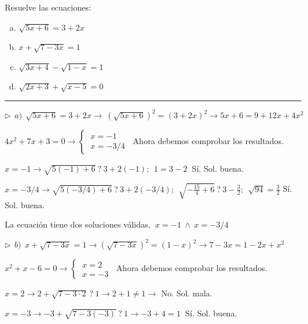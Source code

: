 \begin{miejercicio}

Resuelve las ecuaciones: 

\begin{multicols}{2}
\begin{enumerate}[a) ]
\item $\sqrt{5x+6}=3+2x$
\item $x+\sqrt{7-3x}=1$
\item $\sqrt{3x+4}-\sqrt{1-x}=1$
\item $\sqrt{2x+3}+\sqrt{x-5}=0$	
\end{enumerate}
\end{multicols}

\rule{250pt}{0.1pt}

\vspace{2mm} $\triangleright \ \ a)\ \ \sqrt{5x+6}=3+2x \to \ (\sqrt{5x+6})^2=(3+2x)^2 \to 5x+6=9+12x+4x^2  $

\vspace{2mm} $4x^2+7x+3=0 \to \begin{cases} \ x=-1 \\ \ x=-3/4 \end{cases} \ $ Ahora debemos comprobar los resultados.


\vspace{2mm} $x=-1 \to \sqrt{5(-1)+6} \ ? \  3+2(-1);\ \ 1=3-2 \ $ Sí. Sol. buena.

\vspace{2mm} $x=-3/4 \to \sqrt{5(-3/4)+6}\ ? \ 3+2(-3/4);\ \  \sqrt{-\frac {15}{4} +6} \ ? \ 3-\frac 3 2;\ \ \sqrt{9 4}=\frac 3 2 $ Sí. Sol. buena.

\vspace{2mm} La ecuación tiene dos soluciones válidas, $\ x=-1 \ \wedge \ x=-3/4$

\vspace{5mm} $\triangleright \ \ b)\ \ x+\sqrt{7-3x}=1 \to (\sqrt{7-3x})^2=(1-x)^2 \to 7-3x=1-2x+x^2$

\vspace{2mm} $x^2+x-6=0 \to \begin{cases}\ x=2 \\ \ x=-3 \end{cases}\ $ Ahora debemos comprobar los resultados.

\vspace{2mm} $x=2 \to 2+\sqrt{7-3\cdot 2} \ ? \ 1 \to 2+1 \neq 1 \to $ No. Sol. mala.

\vspace{2mm} $x=-3 \to -3+\sqrt{7-3(-3)}\ ? \ 1 \to -3+4=1\ $ Sí. Sol. buena.


\end{miejercicio}
